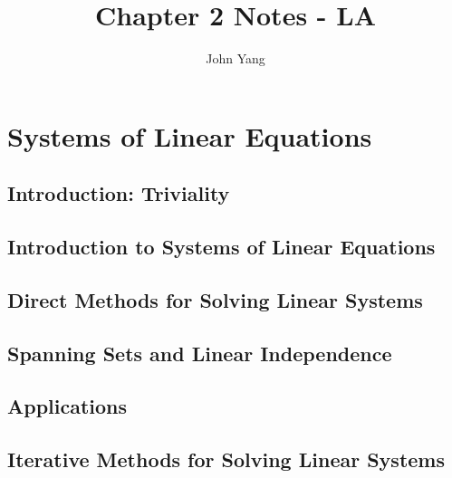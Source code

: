 \documentclass{article}
\title{Chapter 2 Notes - LA} %
\author{John Yang}
\begin{document}
    \maketitle
    \tableofcontents
    \section{Systems of Linear Equations} %
    \setcounter{subsection}{-1}
    \subsection{Introduction: Triviality} %
    \begin{outline}
        
    \end{outline}
    \subsection{Introduction to Systems of Linear Equations}
    \begin{outline}
        
    \end{outline}
    \subsection{Direct Methods for Solving Linear Systems}
    \begin{outline}
        
    \end{outline}
    \subsection{Spanning Sets and Linear Independence}
    \begin{outline}
        
    \end{outline}
    \subsection{Applications}
    \begin{outline}
        
    \end{outline}
    \subsection{Iterative Methods for Solving Linear Systems}
    \begin{outline}
        
    \end{outline}
\end{document}
